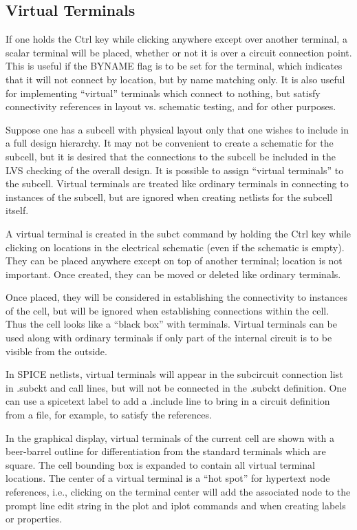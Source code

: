 \subsection{Virtual Terminals}

If one holds the {\kb Ctrl} key while clicking anywhere except over
another terminal, a scalar terminal will be placed, whether or not it
is over a circuit connection point.  This is useful if the {\et
BYNAME} flag is to be set for the terminal, which indicates that it
will not connect by location, but by name matching only.  It is also
useful for implementing ``virtual'' terminals which connect to
nothing, but satisfy connectivity references in layout vs.  schematic
testing, and for other purposes.

Suppose one has a subcell with physical layout only that one wishes to
include in a full design hierarchy.  It may not be convenient to
create a schematic for the subcell, but it is desired that the
connections to the subcell be included in the LVS checking of the
overall design.  It is possible to assign ``virtual terminals'' to the
subcell.  Virtual terminals are treated like ordinary terminals in
connecting to instances of the subcell, but are ignored when creating
netlists for the subcell itself.

A virtual terminal is created in the {\cb subct} command by holding
the {\kb Ctrl} key while clicking on locations in the electrical
schematic (even if the schematic is empty).  They can be placed
anywhere except on top of another terminal; location is not important. 
Once created, they can be moved or deleted like ordinary terminals.

Once placed, they will be considered in establishing the connectivity
to instances of the cell, but will be ignored when establishing
connections within the cell.  Thus the cell looks like a ``black box''
with terminals.  Virtual terminals can be used along with ordinary
terminals if only part of the internal circuit is to be visible from
the outside.

In SPICE netlists, virtual terminals will appear in the subcircuit
connection list in {\vt .subckt} and call lines, but will not be
connected in the {\vt .subckt} definition.  One can use a {\vt
spicetext} label to add a {\vt .include} line to bring in a circuit
definition from a file, for example, to satisfy the references. 

In the graphical display, virtual terminals of the current cell are
shown with a beer-barrel outline for differentiation from the standard
terminals which are square.  The cell bounding box is expanded to
contain all virtual terminal locations.  The center of a virtual
terminal is a ``hot spot'' for hypertext node references, i.e.,
clicking on the terminal center will add the associated node to the
prompt line edit string in the {\cb plot} and {\cb iplot} commands and
when creating labels or properties.


